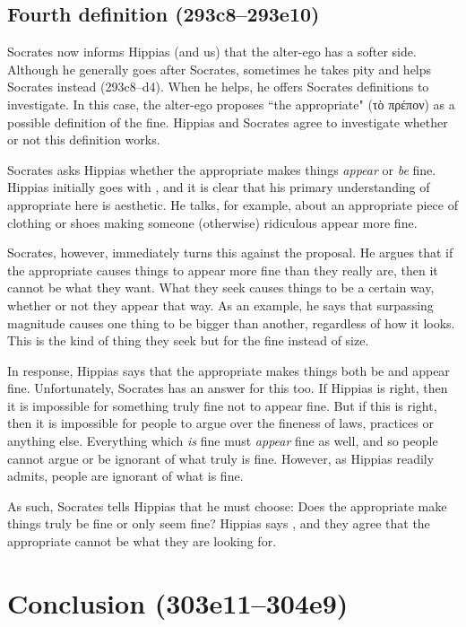 \documentclass[11pt]{article}
\begin{document}

\subsection{Fourth definition (293c8--293e10)}

Socrates now informs Hippias (and us) that the alter-ego has a softer side.  Although he generally goes after Socrates, sometimes he takes pity and helps Socrates instead (293c8--d4).  When he helps, he offers Socrates definitions to investigate.  In this case, the alter-ego proposes ``the appropriate" (τὸ πρέπον) as a possible definition of the fine. Hippias and Socrates agree to investigate whether or not this definition works.

Socrates asks Hippias whether the appropriate makes things \emph{appear} or \emph{be} fine.  Hippias initially goes with , and it is clear that his primary understanding of appropriate here is aesthetic.  He talks, for example, about an appropriate piece of clothing or shoes making someone (otherwise) ridiculous appear more fine.

Socrates, however, immediately turns this against the proposal.  He argues that if the appropriate causes things to appear more fine than they really are, then it cannot be what they want.  What they seek causes things to be a certain way, whether or not they appear that way.  As an example, he says that surpassing magnitude causes one thing to be bigger than another, regardless of how it looks.  This is the kind of thing they seek but for the fine instead of size.

In response, Hippias says that the appropriate makes things both be and appear fine.  Unfortunately, Socrates has an answer for this too.  If Hippias is right, then it is impossible for something truly fine not to appear fine.  But if this is right, then it is impossible for people to argue over the fineness of laws, practices or anything else.  Everything which \emph{is} fine must \emph{appear} fine as well, and so people cannot argue or be ignorant of what truly is fine.  However, as Hippias readily admits, people are ignorant of what is fine.

As such, Socrates tells Hippias that he must choose: Does the appropriate make things truly be fine or only seem fine?  Hippias says , and they agree that the appropriate cannot be what they are looking for.


\section{Conclusion (303e11--304e9)}




\newpage


\end{document}
